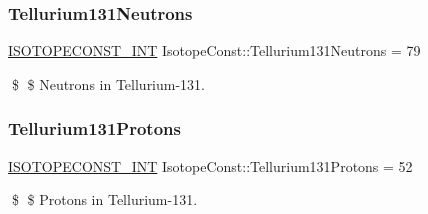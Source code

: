 \subsubsection{\texorpdfstring{Tellurium131\+Neutrons}{Tellurium131Neutrons}}
{\footnotesize\ttfamily \mbox{\hyperlink{group___isotope_const-_macros_ga5f18360b3e99483a35c32d789e62621c}{I\+S\+O\+T\+O\+P\+E\+C\+O\+N\+S\+T\+\_\+\+I\+NT}} Isotope\+Const\+::\+Tellurium131\+Neutrons = 79}

\$ \$ Neutrons in Tellurium-\/131. \mbox{\label{group___isotope_const-_tellurium-_te131_ga17c79ac9fa436442209661339acc1152}} 
\subsubsection{\texorpdfstring{Tellurium131\+Protons}{Tellurium131Protons}}
{\footnotesize\ttfamily \mbox{\hyperlink{group___isotope_const-_macros_ga5f18360b3e99483a35c32d789e62621c}{I\+S\+O\+T\+O\+P\+E\+C\+O\+N\+S\+T\+\_\+\+I\+NT}} Isotope\+Const\+::\+Tellurium131\+Protons = 52}

\$ \$ Protons in Tellurium-\/131. 